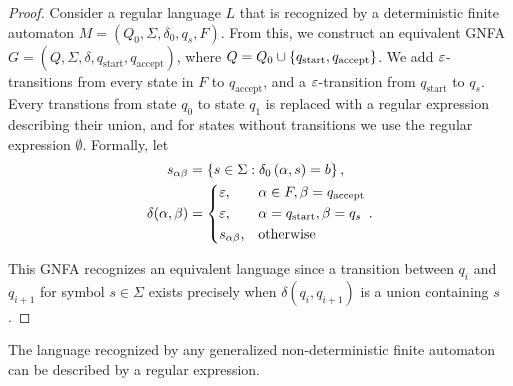 \begin{proof}
    Consider a regular language $L$ that is recognized by a deterministic finite automaton $M = (Q_0, \Sigma, \delta_0, q_{s}, F)$. From this, we construct an equivalent GNFA $G = (Q, \Sigma, \delta, q_{\textrm{start}}, q_{\textrm{accept}})$, where $Q = Q_0 \cup \{q_{\textrm{start}}, q_{\textrm{accept}}\}$. We add $\varepsilon$-transitions from every state in $F$ to $q_{\textrm{accept}}$, and a $\varepsilon$-transition from $q_{\textrm{start}}$ to $q_{s}$. Every transtions from state $q_0$ to state $q_1$ is replaced with a regular expression describing their union, and for states without transitions we use the regular expression $\emptyset$. Formally, let
    \begin{align*}
        s_{\alpha\beta} &= \left\{s \in \Sigma : \delta_0\left(\alpha, s\right) = b\right\}, \\
        \delta(\alpha, \beta) &= \begin{dcases}
            \varepsilon, &\alpha \in F, \beta = q_{\textrm{accept}} \\
            \varepsilon, &\alpha = q_{\textrm{start}}, \beta = q_{s} \\
            s_{\alpha\beta}, &\textrm{otherwise}
        \end{dcases}.
    \end{align*}

    This GNFA recognizes an equivalent language since a transition between $q_i$ and $q_{i+1}$ for symbol $s \in \Sigma$ exists precisely when $\delta(q_i, q_{i+1})$ is a union containing $s$.
\end{proof}

\begin{lemma}\label{gnfa-to-regex}
    The language recognized by any generalized non-deterministic finite automaton can be described by a regular expression.
\end{lemma}

